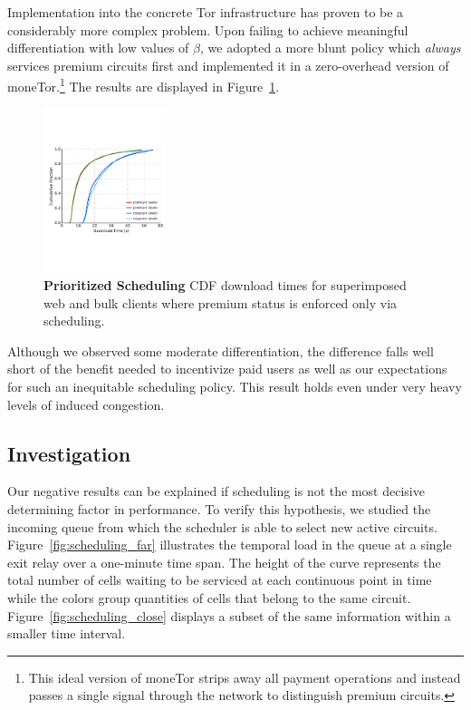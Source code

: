 Implementation into the concrete Tor infrastructure has proven to be a
considerably more complex problem. Upon failing to achieve meaningful
differentiation with low values of $\beta$, we adopted a more blunt policy which
\emph{always} services premium circuits first and implemented it in a
zero-overhead version of moneTor.\footnote{This ideal version of moneTor strips
  away all payment operations and instead passes a single signal through the
  network to distinguish premium circuits.} The results are displayed in
Figure~\ref{fig:scheduling_priority}.

\begin{figure} \centering
  \includegraphics[trim={0 3cm 0 3cm}, clip, width=0.32\textwidth]{images/scheduling_priority.pdf}
  \caption[Prioritized Scheduling]{\textbf{Prioritized Scheduling} CDF download
    times for superimposed web and bulk clients where premium status is enforced
    only via scheduling.}
  \label{fig:scheduling_priority}
\end{figure}

Although we observed some moderate differentiation, the difference falls well
short of the benefit needed to incentivize paid users as well as our
expectations for such an inequitable scheduling policy. This result holds even
under very heavy levels of induced congestion.

\subsection{Investigation}

Our negative results can be explained if scheduling is not the most decisive
determining factor in performance. To verify this hypothesis, we studied the
incoming queue from which the scheduler is able to select new active
circuits. Figure~\ref{fig:scheduling_far} illustrates the temporal load in the
queue at a single exit relay over a one-minute time span. The height of the
curve represents the total number of cells waiting to be serviced at each
continuous point in time while the colors group quantities of cells that belong
to the same circuit. Figure~\ref{fig:scheduling_close} displays a subset of the
same information within a smaller time interval.


